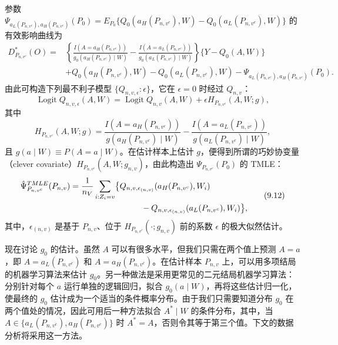 参数
$\Psi_{a_L(P_{n,v^c}),a_H(P_{n,v^c})}(P_0)
=E_{P_0}\{Q_0(a_H(P_{n,v^c}),W)-Q_0(a_L(P_{n,v^c}),W)\}$
的有效影响曲线为
\[
\begin{aligned}
D^*_{P_{n,v^c}}(O)
={}&\left\{\frac{I(A=a_H(P_{n,v^c}))}{g_0(a_H(P_{n,v^c})\mid W)}
-\frac{I(A=a_L(P_{n,v^c}))}{g_0(a_L(P_{n,v^c})\mid W)}\right\}
\{Y-Q_0(A,W)\}\\
&+Q_0(a_H(P_{n,v^c}),W)-Q_0(a_L(P_{n,v^c}),W)
-\Psi_{a_L(P_{n,v^c}),a_H(P_{n,v^c})}(P_0).
\end{aligned}
\]
由此可构造下列最不利子模型 $\{Q_{n,v,\epsilon}:\epsilon\}$，它在 $\epsilon=0$ 时经过 $Q_{n,v}$：
\begin{equation}
\operatorname{Logit}Q_{n,v,\epsilon}(A,W)
=\operatorname{Logit}Q_{n,v}(A,W)+\epsilon H_{P_{n,v^c}}(A,W;g),
\tag{9.10}
\end{equation}
其中
\begin{equation}
H_{P_{n,v^c}}(A,W;g)
=\frac{I(A=a_H(P_{n,v^c}))}{g(a_H(P_{n,v^c})\mid W)}
-\frac{I(A=a_L(P_{n,v^c}))}{g(a_L(P_{n,v^c})\mid W)},
\tag{9.11}
\end{equation}
且 $g(a\mid W)\equiv P(A=a\mid W)$。在估计样本上估计 $g$，便得到所谓的巧妙协变量（clever covariate）$H_{P_{n,v^c}}(A,W;g_{n,v})$，由此构造出 $\Psi_{P_{n,v^c}}(P_0)$ 的 TMLE：
\begin{equation}
\begin{aligned}
\hat\Psi^{TMLE}_{P_{n,v^c}}(P_{n,v})
={}&\frac1{n_V}\sum_{i:Z_i=v}\bigl\{Q_{n,v,\epsilon_{(n,v)}}(a_H(P_{n,v^c}),W_i)\\
&\hspace{7.3em}-Q_{n,v,\epsilon_{(n,v)}}(a_L(P_{n,v^c}),W_i)\bigr\},
\end{aligned}
\tag{9.12}
\end{equation}
其中，$\epsilon_{(n,v)}$ 是基于 $P_{n,v}$、位于 $H_{P_{n,v^c}}(\cdot;g_{n,v})$ 前的系数 $\epsilon$ 的极大似然估计。

现在讨论 $g_0$ 的估计。虽然 $A$ 可以有很多水平，但我们只需在两个值上预测 $A=a$，即 $A=a_L(P_{n,v^c})$ 和 $A=a_H(P_{n,v^c})$。在估计样本 $P_{n,v}$ 上，可以用多项结局的机器学习算法来估计 $g_0$。另一种做法是采用更常见的二元结局机器学习算法：分别针对每个 $a$ 运行单独的逻辑回归，拟合 $g_0(a\mid W)$，再将这些估计归一化，使最终的 $g_0$ 估计成为一个适当的条件概率分布。由于我们只需要知道分布 $g_0$ 在两个值处的情况，因此可用后一种方法拟合 $A^*\mid W$ 的条件分布，其中，当 $A\in\{a_L(P_{n,v^c}),a_H(P_{n,v^c})\}$ 时 $A^*=A$，否则令其等于第三个值。下文的数据分析将采用这一方法。

